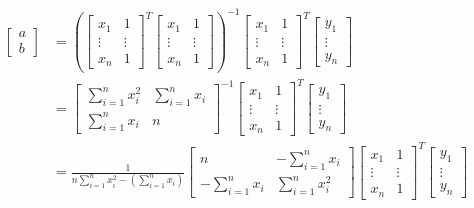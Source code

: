 \documentclass[12pt]{article}
\begin{document}
\begin{align}
\begin{bmatrix}
	a \\
	b
\end{bmatrix} &=
\left(
	\begin{bmatrix}
		x_1 & 1 \\
		\vdots & \vdots \\
		x_n & 1
	\end{bmatrix}^T
	\begin{bmatrix}
		x_1 & 1 \\
		\vdots & \vdots \\
		x_n & 1
	\end{bmatrix}
\right)^{-1}
\begin{bmatrix}
	x_1 & 1 \\
	\vdots & \vdots \\
	x_n & 1
\end{bmatrix}^T
\begin{bmatrix}
	y_1 \\
	\vdots \\
	y_n
\end{bmatrix} \\
&= \begin{bmatrix}
	\sum_{i=1}^nx_i^2 & \sum_{i=1}^nx_i \\
	\sum_{i=1}^nx_i & n
\end{bmatrix}^{-1}
\begin{bmatrix}
	x_1 & 1 \\
	\vdots & \vdots \\
	x_n & 1
\end{bmatrix}^T
\begin{bmatrix}
	y_1 \\
	\vdots \\
	y_n
\end{bmatrix} \\
&= \frac{1}{n\sum_{i=1}^nx_i^2-\left(\sum_{i=1}^nx_i\right)}
\begin{bmatrix}
	n & -\sum_{i=1}^nx_i \\
	-\sum_{i=1}^nx_i & \sum_{i=1}^nx_i^2
\end{bmatrix}
\begin{bmatrix}
	x_1 & 1 \\
	\vdots & \vdots \\
	x_n & 1
\end{bmatrix}^T
\begin{bmatrix}
	y_1 \\
	\vdots \\
	y_n
\end{bmatrix} \\

\end{align}
\end{document}
